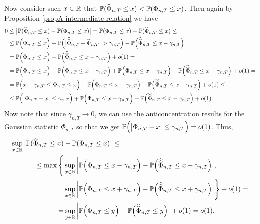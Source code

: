 \documentclass[a4paper,12pt]{article}
\newcommand{\doublehattwo}[1]{\widehat{\widehat{#1}}}
\begin{document}
Now consider such $x\in \mathbb{R}$ that $\mathbb{P}(\widehat{\Phi}_{n,T}\le x) < \mathbb{P}(\Phi_{n, T}\le x)$. Then again by Proposition \ref{propA-intermediate-relation} we have
\begin{align*}\label{eq-theo-stat-equality-step3_2}
0 &\le \big| \pr(\widehat{\Phi}_{n, T} \le x) - \pr(\Phi_{n,T} \le x) \big| =  \pr(\Phi_{n,T} \le x)-  \pr(\widehat{\Phi}_{n, T} \le x) \le \\
&\le\pr\Big(\Phi_{n,T} \le x\Big)  + \pr \Big(\big|\doublehattwo{\Phi}_{n,T} - \widehat{\Phi}_{n,T}\big| > \gamma_{n, T} \Big)   - \pr\Big(\doublehattwo{\Phi}_{n,T} \le x - \gamma_{n, T}\Big) = \\
&= \pr\Big(\Phi_{n,T} \le x\Big)- \pr\Big(\doublehattwo{\Phi}_{n,T} \le x - \gamma_{n, T}\Big)   + o(1)= \\
&= \pr\Big(\Phi_{n,T} \le x\Big) - \pr\Big(\Phi_{n,T} \le x - \gamma_{n, T}\Big) + \pr\Big(\Phi_{n,T} \le x- \gamma_{n, T}\Big) - \pr\Big(\doublehattwo{\Phi}_{n,T} \le x - \gamma_{n, T}\Big)  + o(1)= \\
&= \pr\Big(x - \gamma_{n,T} \le {\Phi}_{n,T} \le x \Big) +\pr\Big(\Phi_{n,T} \le x- \gamma_{n, T}\Big) - \pr\Big(\doublehattwo{\Phi}_{n,T} \le x - \gamma_{n, T}\Big) + o(1)\le \\
&\le \pr\Big(\big|{\Phi}_{n,T} - x \big| \le \gamma_{n, T}\Big) +\pr\Big({\Phi}_{n,T} \le x - \gamma_{n, T}\Big) -\pr\Big(\doublehattwo{\Phi}_{n,T} \le x - \gamma_{n, T}\Big) + o(1).  
\end{align*}
Now note that since {\color{red}$\gamma_{n,T} \to 0$}, we can use the anticoncentration results for the Gaussian statistic ${\Phi}_{n,T}$ so that we get $\mathbb{P}\Big(\big|{\Phi}_{n,T} - x \big| \le \gamma_{n, T}\Big) = o(1)$. Thus, 
\begin{align*}
\sup_{x \in \reals} \big| \pr(\widehat{\Phi}_{n, T} \le x) &- \pr(\Phi_{n,T} \le x) \big| \le \\
\le \max \Bigg\{ &\sup_{x \in \reals} \bigg| \pr\Big({\Phi}_{n,T} \le x - \gamma_{n, T}\Big) -\pr\Big(\doublehattwo{\Phi}_{n,T} \le x - \gamma_{n, T}\Big)\bigg|, \\
&\sup_{x \in \reals} \bigg| \pr\Big({\Phi}_{n,T} \le x + \gamma_{n, T}\Big) -\pr\Big(\doublehattwo{\Phi}_{n,T} \le x + \gamma_{n, T}\Big)\bigg| \Bigg\} + o(1) = \\
=&\sup_{y \in \reals} \bigg| \pr\Big({\Phi}_{n,T} \le y\Big) -\pr\Big(\doublehattwo{\Phi}_{n,T} \le y\Big)\bigg| + o(1) = o(1).
\end{align*}
\end{document}
